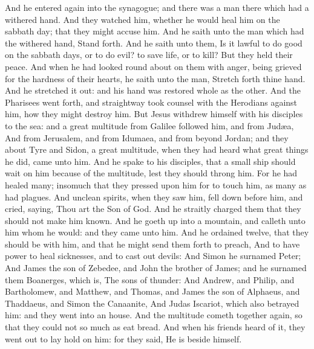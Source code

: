  And he entered again into the synagogue; and there was a
man there which had a withered hand.  And they watched him,
whether he would heal him on the sabbath day; that they might accuse
him.  And he saith unto the man which had the withered hand,
Stand forth.  And he saith unto them, Is it lawful to do
good on the sabbath days, or to do evil? to save life, or to kill? But
they held their peace.  And when he had looked round about
on them with anger, being grieved for the hardness of their hearts, he
saith unto the man, Stretch forth thine hand. And he stretched it out:
and his hand was restored whole as the other.  And the
Pharisees went forth, and straightway took counsel with the Herodians
against him, how they might destroy him.  But Jesus withdrew
himself with his disciples to the sea: and a great multitude from
Galilee followed him, and from Judæa,  And from Jerusalem,
and from Idumaea, and from beyond Jordan; and they about Tyre and Sidon,
a great multitude, when they had heard what great things he did, came
unto him.  And he spake to his disciples, that a small ship
should wait on him because of the multitude, lest they should throng
him.  For he had healed many; insomuch that they pressed
upon him for to touch him, as many as had plagues.  And
unclean spirits, when they saw him, fell down before him, and cried,
saying, Thou art the Son of God.  And he straitly charged
them that they should not make him known.  And he goeth up
into a mountain, and calleth unto him whom he would: and they came unto
him.  And he ordained twelve, that they should be with him,
and that he might send them forth to preach,  And to have
power to heal sicknesses, and to cast out devils:  And
Simon he surnamed Peter;  And James the son of Zebedee, and
John the brother of James; and he surnamed them Boanerges, which is, The
sons of thunder:  And Andrew, and Philip, and Bartholomew,
and Matthew, and Thomas, and James the son of Alphaeus, and Thaddaeus,
and Simon the Canaanite,  And Judas Iscariot, which also
betrayed him: and they went into an house.  And the
multitude cometh together again, so that they could not so much as eat
bread.  And when his friends heard of it, they went out to
lay hold on him: for they said, He is beside himself.

